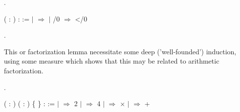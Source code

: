 \coqdocemptyline
\begin{coqdoccode}
\coqdocnoindent
{} .\coqdoceol
\end{coqdoccode}
\coqdoceol
\coqdocemptyline
\coqdocnoindent
{}  ( : ) :  :=\coqdoceol
\coqdocindent{1.00em}
  \coqdoceol
\coqdocindent{1.00em}
\ensuremath{|}   \ensuremath{\Rightarrow}  \coqdoceol
\coqdocindent{1.00em}
\ensuremath{|}  /0  \ensuremath{\Rightarrow}   </0 \coqdoceol
\coqdocindent{1.00em}

\coqdocemptyline
\begin{coqdoccode}
\coqdocemptyline
\coqdocnoindent
{} .\coqdoceol
\end{coqdoccode}
This  or factorization lemma necessitate some deep ('well-founded') induction,
using some measure  which shows that this may be related to
arithmetic factorization. \begin{coqdoccode}
\coqdocnoindent
{} .\coqdoceol
\end{coqdoccode}
\coqdoceol
\coqdocemptyline
\coqdocnoindent
{}  (  : ) ( :   ) \{ \} :  :=\coqdoceol
\coqdocindent{1.00em}
  \coqdoceol
\coqdocindent{1.00em}
\ensuremath{|}  \coqdocvar{\_} \ensuremath{\Rightarrow} 2\coqdoceol
\coqdocindent{1.00em}
\ensuremath{|}  \coqdocvar{\_} \coqdocvar{\_} \coqdocvar{\_} \ensuremath{\Rightarrow} 4\coqdoceol
\coqdocindent{1.00em}
\ensuremath{|}        \ensuremath{\Rightarrow}     \ensuremath{\times}    \coqdoceol
\coqdocindent{1.00em}
\ensuremath{|}       \ensuremath{\Rightarrow}     +    \coqdoceol
\coqdocindent{1.00em}

